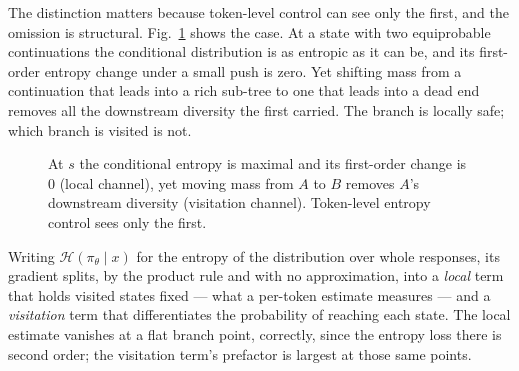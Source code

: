 \documentclass[runningheads]{llncs}
\newcommand{\Htraj}{\mathcal{H}}
\newcommand{\pit}{\pi_{\theta}}
\begin{document}
The distinction matters because token-level control can see only the first, and the
omission is structural. Fig.~\ref{fig:branch} shows the case. At a state with two
equiprobable continuations the conditional distribution is as entropic as it can be,
and its first-order entropy change under a small push is zero. Yet shifting mass from
a continuation that leads into a rich sub-tree to one that leads into a dead end
removes all the downstream diversity the first carried. The branch is locally safe;
which branch is visited is not.

\begin{figure}[t]
\centering
{}
\caption{At $s$ the conditional entropy is maximal and its first-order change is $0$
(local channel), yet moving mass from $A$ to $B$ removes $A$'s downstream diversity
(visitation channel). Token-level entropy control sees only the first.}
\label{fig:branch}
\end{figure}

Writing $\Htraj(\pit \mid x)$ for the entropy of the distribution over whole
responses, its gradient splits, by the product rule and with no approximation, into a
\emph{local} term that holds visited states fixed --- what a per-token estimate
measures --- and a \emph{visitation} term that differentiates the probability of
reaching each state. The local estimate vanishes at a flat branch point, correctly,
since the entropy loss there is second order; the visitation term's prefactor is
largest at those same points.
\end{document}
